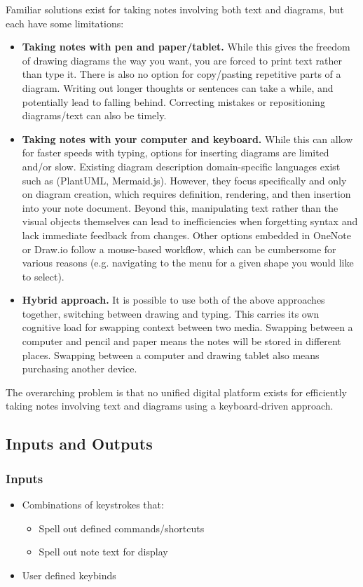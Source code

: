 \documentclass{article}
\begin{document}
\noindent Familiar solutions exist for taking notes involving both text and diagrams, but
each have some limitations:
\begin{itemize}
  \item \textbf{Taking notes with pen and paper/tablet.} While this gives the
    freedom of drawing diagrams the way you want, you are forced to print text
    rather than type it. There is also no option for copy/pasting repetitive
    parts of a diagram. Writing out longer thoughts or sentences can take a
    while, and potentially lead to falling behind. Correcting mistakes or
    repositioning diagrams/text can also be timely.
  \item \textbf{Taking notes with your computer and keyboard.} While this can
    allow for faster speeds with typing, options for inserting diagrams are
    limited and/or slow. Existing diagram description domain-specific languages
    exist such as (PlantUML, Mermaid.js). However, they focus
    specifically and only on diagram creation, which requires definition,
    rendering, and then insertion into your note document. Beyond this,
    manipulating text rather than the visual objects themselves can lead to
    inefficiencies when forgetting syntax and lack immediate feedback from
    changes. Other options embedded in OneNote or Draw.io follow a mouse-based
    workflow, which can be cumbersome for various reasons (e.g. navigating to
    the menu for a given shape you would like to select).
  \item \textbf{Hybrid approach.} It is possible to use both of the above approaches
    together, switching between drawing and typing. This carries its own
    cognitive load for swapping context between two media. Swapping between a
    computer and pencil and paper means the notes will be stored in different
    places. Swapping between a computer and drawing tablet also means
    purchasing another device.
\end{itemize}

\noindent The overarching problem is that no unified digital platform exists for
efficiently taking notes involving text and diagrams using a keyboard-driven
approach.

\subsection{Inputs and Outputs}

\subsubsection{Inputs}
\begin{itemize}
	\item Combinations of keystrokes that:
	      \begin{itemize}
		      \item Spell out defined commands/shortcuts
		      \item Spell out note text for display
	      \end{itemize}
	\item User defined keybinds
\end{itemize}
\end{document}
